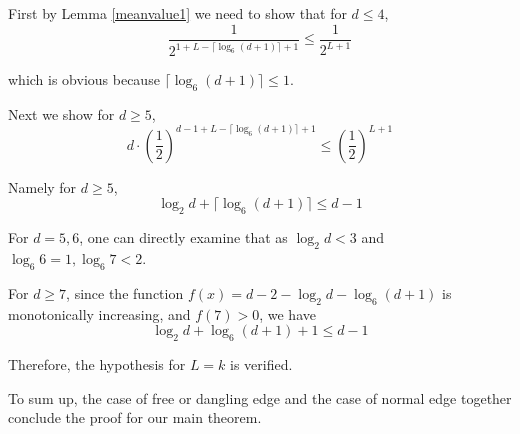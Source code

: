 		First by Lemma \ref{meanvalue1} we need to show that for $d \leq 4$,
        \[\frac{1}{2^{1+L-\lceil \log_6{(d+1)}\rceil + 1}} \leq \frac{1}{2^{L+1}}\]

		which is obvious because $\lceil\log_6{(d+1)}\rceil \leq 1$.

		Next we show for $d \geq 5$,
        \[ d\cdot \left( \frac{1}{2} \right)^{d-1 + L - \lceil \log_6{(d+1)}\rceil + 1}  \leq \left( \frac{1}{2} \right)^{L + 1} \]

		Namely for $d \geq 5$,
		\[ \log_2 d + \lceil \log_6{(d+1)} \rceil \leq d-1\]

		For $d=5,6$, one can directly examine that as $\log_2 d < 3$ and $\log_6 6 =1, \log_6 7 < 2$.


		For $d\geq 7$, since the function $f(x) = d-2 -\log_2 d - \log_6{(d+1)}$ is monotonically increasing, and $f(7)>0$, we have
        \[ \log_2 d + \log_6{(d+1)} + 1 \leq d-1\]

%
%
%
%

		Therefore, the hypothesis for $L=k$ is verified.

		To sum up, the case of free or dangling edge and the case of normal edge together conclude the proof for our main theorem.

